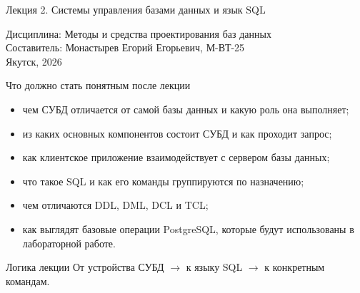 \documentclass[aspectratio=169]{beamer}
\begin{document}
\begin{frame}[plain]
  \vspace*{1cm}
  \begin{center}
    \colorbox{svfuDark}{%
      \parbox[c][2.8cm][c]{0.86\paperwidth}{%
        \centering
        {\LARGE\color{white}Лекция 2. Системы управления базами данных и язык SQL}
      }%
    }
  \end{center}
  \vfill
  \centering
  {\normalsize Дисциплина: Методы и средства проектирования баз данных}\\[4pt]
  {\small Составитель: Монастырев Егорий Егорьевич, М-ВТ-25}\\[4pt]
  {\small Якутск, 2026}
  \vfill
\end{frame}

\begin{frame}{Что должно стать понятным после лекции}
\begin{itemize}
  \item чем СУБД отличается от самой базы данных и какую роль она выполняет;
  \item из каких основных компонентов состоит СУБД и как проходит запрос;
  \item как клиентское приложение взаимодействует с сервером базы данных;
  \item что такое SQL и как его команды группируются по назначению;
  \item чем отличаются DDL, DML, DCL и TCL;
  \item как выглядят базовые операции PostgreSQL, которые будут использованы в лабораторной работе.
\end{itemize}

\vspace{0.25cm}
\begin{alertblock}{Логика лекции}
От устройства СУБД \;$\rightarrow$\; к языку SQL \;$\rightarrow$\; к конкретным командам.
\end{alertblock}
\end{frame}
\end{document}
